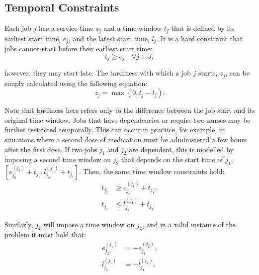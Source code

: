 \documentclass[a4paper,11pt,authoryear]{elsarticle}
\begin{document}

\subsection{Temporal Constraints}
\label{sub:temporalconstraints}
\noindent Each job $j$ has a service time $s_j$ and a time window $t_j$ that is defined by its earliest start time, $e_j$, and the latest start time, $l_j$. It is a hard constraint that jobs cannot start before their earliest start time:
\begin{equation}
    t_j \geq e_j \quad \forall j \in J, \label{eq:jobstart}
\end{equation}

\noindent however, they may start late. The tardiness with which a job $j$ starts, $z_j$, can be simply calculated using the following equation:
\begin{equation}
    z_j = \max(0, t_j - l_j). \label{eq:tardiness}
\end{equation}

\noindent Note that tardiness here refers only to the difference between the job start and its original time window. Jobs that have dependencies or require two nurses may be further restricted temporally. This can occur in practice, for example, in situations where a second dose of medication must be administered a few hours after the first dose. If two jobs $j_1$ and $j_2$ are dependent, this is modelled by imposing a second time window on $j_2$ that depends on the start time of $j_1$, $[e^{(j_1)}_{j_2} + t_{j_1}, l^{(j_1)}_{j_2} + t_{j_1}]$. Then, the same time window constraints hold:
\begin{subequations}
	\begin{align}
	t_{j_2} &\geq e^{(j_1)}_{j_2} + t_{j_1}, \label{eq:timewindow1}\\[3pt] %
	t_{j_2} &\leq l^{(j_1)}_{j_2} + t_{j_1}. \label{eq:timewindow2} %
	\end{align}
\end{subequations}

\noindent Similarly, $j_2$ will impose a time window on $j_1$, and in a valid instance of the problem it must hold that:
\begin{subequations}
	\begin{align}
	e^{(j_1)}_{j_2} &= -e^{(j_2)}_{j_1}, \label{eq:earliesttimedependecies}\\[3pt]
	l^{(j_1)}_{j_2} &= -l^{(j_2)}_{j_1}. \label{eq:latesttimedependencies}
	\end{align}
\end{subequations}
\end{document}
